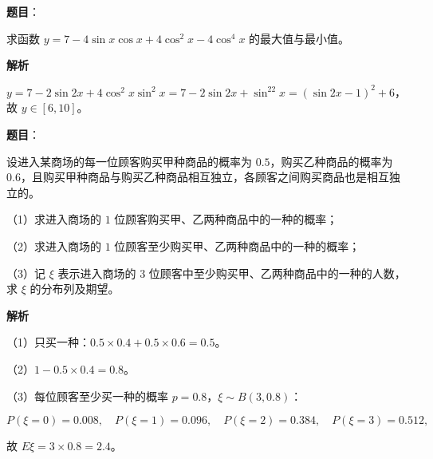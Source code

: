 \begin{answer}

\textbf{题目}：

求函数 $y=7-4\sin x\cos x+4\cos^2x-4\cos^4x$ 的最大值与最小值。

\textbf{解析}

$y=7-2\sin2x+4\cos^2x\sin^2x=7-2\sin2x+\sin^22x=(\sin2x-1)^2+6$，故 $y\in[6,10]$。


\end{answer}
\begin{answer}

\textbf{题目}：

设进入某商场的每一位顾客购买甲种商品的概率为 $0.5$，购买乙种商品的概率为 $0.6$，且购买甲种商品与购买乙种商品相互独立，各顾客之间购买商品也是相互独立的。

（1）求进入商场的 $1$ 位顾客购买甲、乙两种商品中的一种的概率；

（2）求进入商场的 $1$ 位顾客至少购买甲、乙两种商品中的一种的概率；

（3）记 $\xi$ 表示进入商场的 $3$ 位顾客中至少购买甲、乙两种商品中的一种的人数，求 $\xi$ 的分布列及期望。

\textbf{解析}

（1）只买一种：$0.5\times0.4+0.5\times0.6=0.5$。

（2）$1-0.5\times0.4=0.8$。

（3）每位顾客至少买一种的概率 $p=0.8$，$\xi\sim B(3,0.8)$：

\nopagebreak[4]
\[P(\xi=0)=0.008,\quad P(\xi=1)=0.096,\quad P(\xi=2)=0.384,\quad P(\xi=3)=0.512,\]

故 $E\xi=3\times0.8=2.4$。


\end{answer}
